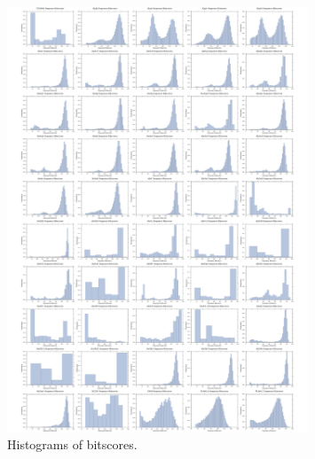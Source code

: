 \begin{figure} %
\centering
\includegraphics[width=0.8\textwidth]{figs/dualbirth-bit-hists}
\caption[Histograms of bitscores]
{Histograms of bitscores.}
\label{fig:dualbirth-bit-hists}
\end{figure}

